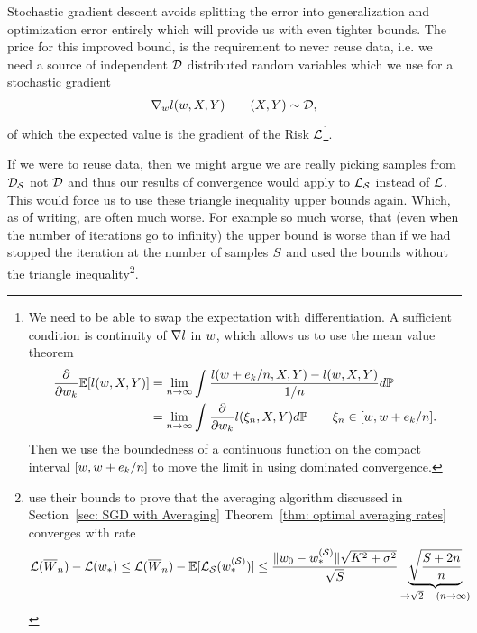 Stochastic gradient descent avoids splitting the error into generalization and
optimization error entirely which will provide us with even tighter bounds. The
price for this improved bound, is the requirement to never reuse data, i.e. we
need a source of independent \(\mathcal{D}\) distributed random variables which we use
for a stochastic gradient
%
\begin{align*}
	\nabla_wl (w, X,Y) \qquad (X,Y)\sim\mathcal{D},
\end{align*}
%
of which the expected value is the gradient of the Risk \(\mathcal{L}\)\footnote{
	We need to be able to swap the expectation with differentiation. A sufficient 
	condition is continuity of \(\nabla l\) in \(w\), which allows us
	to use the mean value theorem
	\begin{align*}
		\frac{\partial}{\partial w_k}\mathbb{E}[l(w, X,Y)]
		&= \lim_{n\to\infty}
		\int\frac{l(w+e_k/n, X,Y)-l(w,X,Y)}{1/n}d\mathbb{P}
		\\
		&=\lim_{n\to\infty} \int\frac{\partial}{\partial w_k}l(\xi_n, X,Y)d\mathbb{P}
		\qquad \xi_n \in [w, w + e_k/n].
	\end{align*}
	Then we use the boundedness of a continuous function on the compact interval
	\([w, w + e_k/n]\) to move the limit in using
	dominated convergence.
}.

If we were to reuse data, then we might argue we are really picking samples
from \(\mathcal{D}_{\mathcal{S}}\) not \(\mathcal{D}\) and thus our results of convergence would
apply to \(\mathcal{L}_{\mathcal{S}}\) instead of \(\mathcal{L}\). This would force us to use
these triangle inequality upper bounds again. Which, as of writing, are often
much worse. For example so much worse, that (even when the number of iterations go to
infinity) the upper bound is worse than if we had stopped the iteration at the
number of samples \(S\) and used the bounds without the triangle
inequality\footnote{
	\textcite{hardtTrainFasterGeneralize2016} use their bounds to prove that
	the averaging algorithm discussed in Section~\ref{sec: SGD with Averaging}
	Theorem~\ref{thm: optimal averaging rates} converges with rate
	\begin{align*}
		\mathcal{L}(\overline{W}_n) - \mathcal{L}(w_*)
		\le \mathcal{L}(\overline{W}_n) - \mathbb{E}[\mathcal{L}_{\mathcal{S}}(w_*^{(\mathcal{S})})]
		\le \frac{\|w_0 -w_*^{(\mathcal{S})}\|\sqrt{K^2 + \sigma^2}}{\sqrt{S}}
		\underbrace{\sqrt{\frac{S+2n}{n}}}_{\to \sqrt{2} \quad (n\to\infty)}
	\end{align*}
}.


